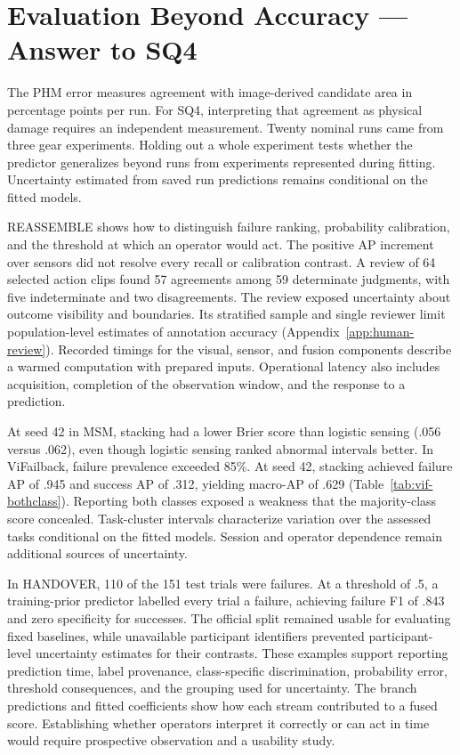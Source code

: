 \section{Evaluation Beyond Accuracy --- Answer to SQ4}
The PHM error measures agreement with image-derived candidate area in percentage points
per run. For SQ4, interpreting that agreement as physical damage requires an independent
measurement. Twenty nominal runs came from three gear experiments. Holding out a whole
experiment tests whether the predictor generalizes beyond runs from experiments
represented during fitting. Uncertainty estimated from saved run predictions remains
conditional on the fitted models.

REASSEMBLE shows how to distinguish failure ranking, probability calibration, and the
threshold at which an operator would act. The positive AP increment over sensors did not
resolve every recall or calibration contrast. A review of 64 selected action clips found
57 agreements among 59 determinate judgments, with five indeterminate and two
disagreements. The review exposed uncertainty about outcome visibility and boundaries.
Its stratified sample and single reviewer limit population-level estimates of annotation
accuracy (Appendix~\ref{app:human-review}). Recorded timings for the visual, sensor, and
fusion components describe a warmed computation with prepared inputs. Operational
latency also includes acquisition, completion of the observation window, and the
response to a prediction.

At seed 42 in MSM, stacking had a lower Brier score than logistic sensing (.056 versus
.062), even though logistic sensing ranked abnormal intervals better. In ViFailback,
failure prevalence exceeded 85\%. At seed 42, stacking achieved failure AP of .945 and
success AP of .312, yielding macro-AP of .629 (Table~\ref{tab:vif-bothclass}). Reporting
both classes exposed a weakness that the majority-class score concealed. Task-cluster
intervals characterize variation over the assessed tasks conditional on the fitted
models. Session and operator dependence remain additional sources of uncertainty.

In HANDOVER, 110 of the 151 test trials were failures. At a threshold of .5, a
training-prior predictor labelled every trial a failure, achieving failure F1 of .843
and zero specificity for successes. The official split remained usable for evaluating
fixed baselines, while unavailable participant identifiers prevented participant-level
uncertainty estimates for their contrasts. These examples support reporting prediction
time, label provenance, class-specific discrimination, probability error, threshold
consequences, and the grouping used for uncertainty. The branch predictions and fitted
coefficients show how each stream contributed to a fused score. Establishing whether
operators interpret it correctly or can act in time would require prospective
observation and a usability study.

